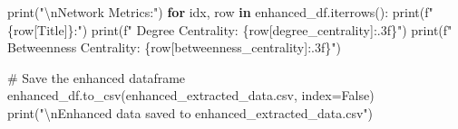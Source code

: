 \documentclass[
  11pt,
  letterpaper,
]{book}
\newenvironment{Shaded}{\begin{snugshade}}{\end{snugshade}}
\newcommand{\BuiltInTok}[1]{\textcolor[rgb]{0.00,0.23,0.31}{#1}}
\newcommand{\CharTok}[1]{\textcolor[rgb]{0.13,0.47,0.30}{#1}}
\newcommand{\CommentTok}[1]{\textcolor[rgb]{0.37,0.37,0.37}{#1}}
\newcommand{\ControlFlowTok}[1]{\textcolor[rgb]{0.00,0.23,0.31}{\textbf{#1}}}
\newcommand{\KeywordTok}[1]{\textcolor[rgb]{0.00,0.23,0.31}{\textbf{#1}}}
\newcommand{\NormalTok}[1]{\textcolor[rgb]{0.00,0.23,0.31}{#1}}
\newcommand{\OperatorTok}[1]{\textcolor[rgb]{0.37,0.37,0.37}{#1}}
\newcommand{\SpecialCharTok}[1]{\textcolor[rgb]{0.37,0.37,0.37}{#1}}
\newcommand{\SpecialStringTok}[1]{\textcolor[rgb]{0.13,0.47,0.30}{#1}}
\newcommand{\StringTok}[1]{\textcolor[rgb]{0.13,0.47,0.30}{#1}}
\newcommand{\VariableTok}[1]{\textcolor[rgb]{0.07,0.07,0.07}{#1}}
\begin{document}
\begin{Shaded}
\begin{Highlighting}[]
\BuiltInTok{print}\NormalTok{(}\StringTok{"}\CharTok{\textbackslash{}n}\StringTok{Network Metrics:"}\NormalTok{)}
\ControlFlowTok{for}\NormalTok{ idx, row }\KeywordTok{in}\NormalTok{ enhanced\_df.iterrows():}
    \BuiltInTok{print}\NormalTok{(}\SpecialStringTok{f"}\SpecialCharTok{\{}\NormalTok{row[}\StringTok{\textquotesingle{}Title\textquotesingle{}}\NormalTok{]}\SpecialCharTok{\}}\SpecialStringTok{:"}\NormalTok{)}
    \BuiltInTok{print}\NormalTok{(}\SpecialStringTok{f"  Degree Centrality: }\SpecialCharTok{\{}\NormalTok{row[}\StringTok{\textquotesingle{}degree\_centrality\textquotesingle{}}\NormalTok{]}\SpecialCharTok{:.3f\}}\SpecialStringTok{"}\NormalTok{)}
    \BuiltInTok{print}\NormalTok{(}\SpecialStringTok{f"  Betweenness Centrality: }\SpecialCharTok{\{}\NormalTok{row[}\StringTok{\textquotesingle{}betweenness\_centrality\textquotesingle{}}\NormalTok{]}\SpecialCharTok{:.3f\}}\SpecialStringTok{"}\NormalTok{)}

\CommentTok{\# Save the enhanced dataframe}
\NormalTok{enhanced\_df.to\_csv(}\StringTok{\textquotesingle{}enhanced\_extracted\_data.csv\textquotesingle{}}\NormalTok{, index}\OperatorTok{=}\VariableTok{False}\NormalTok{)}
\BuiltInTok{print}\NormalTok{(}\StringTok{"}\CharTok{\textbackslash{}n}\StringTok{Enhanced data saved to \textquotesingle{}enhanced\_extracted\_data.csv\textquotesingle{}"}\NormalTok{)}
\end{Highlighting}
\end{Shaded}
\end{document}
